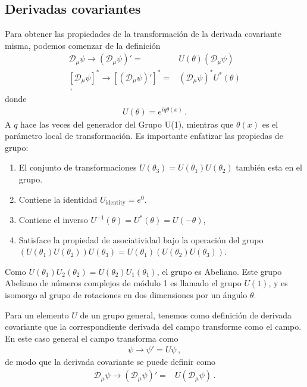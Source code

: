 \begin{subappendices}
\subsection{Derivadas covariantes}
\label{sec:dv}
\begin{frame}
Para obtener las propiedades de la transformación de la derivada covariante misma, podemos comenzar de la definición
\begin{align}
    \mathcal{D}_\mu \psi\to\left(\mathcal{D}_\mu \psi\right)'=&U(\theta)\left(\mathcal{D}_\mu \psi\right) \nonumber\\
    \left[ \mathcal{D}_\mu \psi  \right]^{*}\to \left[ \left(\mathcal{D}_\mu \psi\right)'  \right]^{*}=&\left(\mathcal{D}_\mu \psi\right)^{*} U^{*}(\theta) \nonumber\\
\,,
\end{align}
donde
\begin{align}
  U(\theta)=e^{iq\theta(x)}\,.
\end{align}
A $q$ hace las veces del generador del Grupo U(1), mientras que $\theta(x)$ es el parámetro local de transformación.
Es importante enfatizar las propiedas de grupo:
\begin{enumerate}
\item El conjunto de transformaciones  $U(\theta_3)=U(\theta_1)U(\theta_2)$ también esta en el grupo.
\item Contiene la identidad
$U_{\text{identity}}=e^{0}$.
\item Contiene  el inverso $U^{-1}(\theta)=U^{*}(\theta)=U(-\theta)$,
\item Satisface la propiedad de asociatividad bajo la operación del grupo $\left( U(\theta_1)U(\theta_2) \right)U (\theta_3 )=U(\theta_1)\left( U(\theta_2)U(\theta_3) \right)$. 
\end{enumerate}
Como $U(\theta_1)U_2(\theta_2)=U(\theta_2)U_1(\theta_1)$, el grupo es Abeliano. Este grupo Abeliano de números complejos de módulo 1 es llamado el grupo $U(1)$, 
y es isomorgo al grupo de rotaciones en dos dimensiones por un ángulo  $\theta$. 

\end{frame}

Para un elemento $U$ de un grupo general, tenemos como definición de derivada covariante que la correspondiente derivada del campo transforme como el campo. En este caso general el campo transforma como
\begin{align}
  \psi\to\psi'=U\psi\,,
\end{align}
de modo que la derivada covariante se puede definir como
\begin{align}
     \mathcal{D}_\mu \psi\to\left(\mathcal{D}_\mu \psi\right)'=&U\left(\mathcal{D}_\mu \psi\right)\,.
\end{align}


\end{subappendices}
